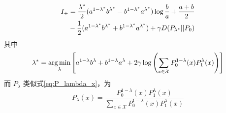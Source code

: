 \begin{lemma}\label{lem:I_plus_expression}
\begin{align}\label{equation:I+}
    I_+ &=\frac{\lambda^* }{2} (a^{1-\lambda^* }b^{\lambda^* } -
    b^{1-\lambda^* }a^{\lambda^* })\log\frac{b}{a}+\frac{a+b}{2}\notag \\
    &-\frac{1}{2}(a^{1-\lambda^*}b^{\lambda^*} +
    b^{1-\lambda^* }a^{\lambda^* })+\gamma D(P_{\lambda^* }||P_0) 
	\end{align}
	其中
	\begin{equation}\label{eq:lambda}
    \lambda^* = \operatorname*{arg\,min}_{\lambda} \left[a^{1-\lambda}b^{\lambda} +
    b^{1-\lambda}a^{\lambda} + 2\gamma \log
    \left(\sum_{x\in \mathcal{X}}P^{1-\lambda}_0(x) P^{\lambda}_1(x)
    \right)
    \right]
\end{equation}
而 $P_{\lambda}$ 类似式\eqref{eq:P_lambda_x}，为
\begin{equation}\label{eq:P_lambda_0_1}
    P_{\lambda}(x) = \frac{P_0^{1-\lambda}(x) P_1^{\lambda} (x)}
    {\sum_{x \in \mathcal{X}}P_0^{1-\lambda}(x) P_1^{\lambda} (x)}        
\end{equation}

\end{lemma}


